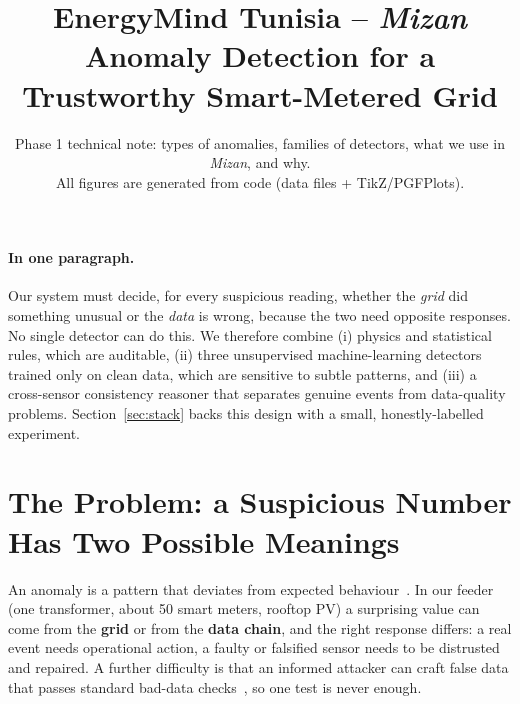 \documentclass[11pt,a4paper]{article}
\title{EnergyMind Tunisia -- \textit{Mizan}\\[2pt]\large Anomaly Detection for a Trustworthy Smart-Metered Grid}
\author{}
\date{\small Phase 1 technical note: types of anomalies, families of detectors, what we use in \textit{Mizan}, and why.\\
All figures are generated from code (data files + TikZ/PGFPlots).}
\begin{document}
\maketitle

\paragraph{In one paragraph.} Our system must decide, for every suspicious reading, whether the \emph{grid}
did something unusual or the \emph{data} is wrong, because the two need opposite responses. No single
detector can do this. We therefore combine (i) physics and statistical rules, which are auditable,
(ii) three unsupervised machine-learning detectors trained only on clean data, which are sensitive to subtle
patterns, and (iii) a cross-sensor consistency reasoner that separates genuine events from data-quality
problems. Section~\ref{sec:stack} backs this design with a small, honestly-labelled experiment.

\section{The Problem: a Suspicious Number Has Two Possible Meanings}
\label{sec:problem}
An anomaly is a pattern that deviates from expected behaviour~\cite{chandola}. In our feeder (one
transformer, about 50 smart meters, rooftop PV) a surprising value can come from the \textbf{grid} or from
the \textbf{data chain}, and the right response differs: a real event needs operational action, a faulty or
falsified sensor needs to be distrusted and repaired. A further difficulty is that an informed attacker can
craft false data that passes standard bad-data checks~\cite{fdi}, so one test is never enough.
\end{document}
